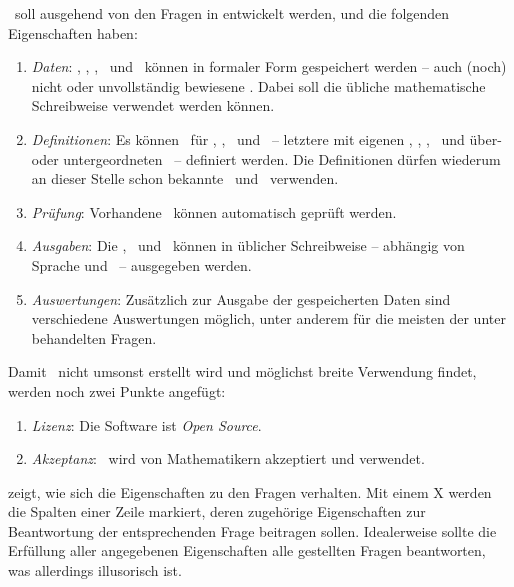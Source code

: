 \ASBA\ soll ausgehend von den Fragen in  entwickelt werden, und die folgenden Eigenschaften haben:
\begin{enumerate}
	\item \label{Eigenschaft:Daten} \emph{Daten}:
	\Axiome, \Saetze, \Beweise, \Fachbegriffe\ und \Fachgebiete\ können in formaler Form gespeichert werden -- auch (noch) nicht oder unvollständig bewiesene \Saetze.
	Dabei soll die übliche mathematische Schreibweise verwendet werden können.
	\item \label{Eigenschaft:Definitionen} \emph{Definitionen}:
	Es können \Fachbegriffe\ für \Axiome, \Saetze, \Beweise\ und \Fachgebiete\ -- letztere mit eigenen \Axiomen, \Saetzen, \Beweisen, \Fachbegriffen\ und über- oder untergeordneten \Fachgebieten\ -- definiert werden.
	Die Definitionen dürfen wiederum an dieser Stelle schon bekannte \Fachbegriffe\ und \Fachgebiete\ verwenden.
	\item \label{Eigenschaft:Prüfung} \emph{Prüfung}:
	Vorhandene \Beweise\ können automatisch geprüft werden.
	\item \label{Eigenschaft:Ausgaben} \emph{Ausgaben}:
	Die \Axiome, \Saetze\ und \Beweise\ können in üblicher Schreibweise -- abhängig von Sprache und \Fachgebiet\ -- ausgegeben werden.
	\item \label{Eigenschaft:Auswertungen} \emph{Auswertungen}:
	Zusätzlich zur Ausgabe der gespeicherten Daten sind verschiedene Auswertungen möglich, unter anderem für die meisten der unter  behandelten Fragen.
	\setcounter{Enumi}{\value{enumi}}%
\end{enumerate}
%
Damit \ASBA\ nicht umsonst erstellt wird und möglichst breite Verwendung findet, werden noch zwei Punkte angefügt:
\begin{enumerate}
	\setcounter{enumi}{\value{Enumi}}%
	\item \label{Eigenschaft:Lizenz} \emph{Lizenz}:
	Die Software ist \emph{Open Source}.
	\item \label{Eigenschaft:Akzeptanz} \emph{Akzeptanz}:
	\ASBA\ wird von Mathematikern akzeptiert und verwendet.
\end{enumerate}
%
 zeigt, wie sich die Eigenschaften zu den Fragen  verhalten.
Mit einem X werden die Spalten einer Zeile markiert, deren zugehörige Eigenschaften zur Beantwortung der entsprechenden Frage beitragen sollen.
Idealerweise sollte die Erfüllung aller angegebenen Eigenschaften alle gestellten Fragen beantworten, was allerdings illusorisch ist.
